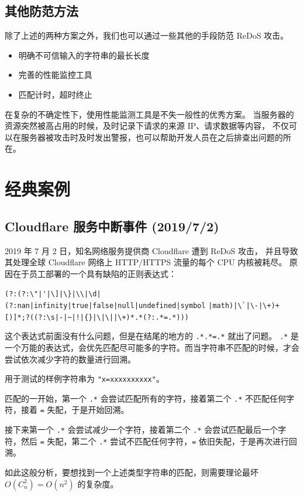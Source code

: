 \documentclass[hyperref,UTF8,12pt,a4paper]{ctexart}
\begin{document}
\subsection{其他防范方法}

除了上述的两种方案之外，我们也可以通过一些其他的手段防范 ReDoS 攻击。

\begin{itemize}
	\item 明确不可信输入的字符串的最长长度
	\item 完善的性能监控工具
	\item 匹配计时，超时终止
\end{itemize}

在复杂的不确定性下，使用性能监测工具是不失一般性的优秀方案。
当服务器的资源突然被高占用的时候，及时记录下请求的来源 IP、请求数据等内容，
不仅可以在服务器被攻击时及时发出警报，也可以帮助开发人员在之后排查出问题的所在。

\section{经典案例}

\subsection{Cloudflare 服务中断事件 (2019/7/2)}

2019 年 7 月 2 日，知名网络服务提供商 Cloudflare 遭到 ReDoS 攻击，
并且导致其处理全球 Cloudflare 网络上 HTTP/HTTPS 流量的每个 CPU 内核被耗尽。
原因在于员工部署的一个具有缺陷的正则表达式：

\verb^(?:(?:\"|'|\]|\}|\\|\d|(?:nan|infinity|true|false|null|undefined|symbol^
\verb^|math)|\`|\-|\+)+[)]*;?((?:\s|-|~|!|{}|\|\||\+)*.*(?:.*=.*)))^

这个表达式前面没有什么问题，但是在结尾的地方的 \verb|.*.*=.*| 就出了问题。
\verb|.*| 是一个万能的表达式，会优先匹配尽可能多的字符。而当字符串不匹配的时候，才会尝试依次减少字符的数量进行回溯。

用于测试的样例字符串为 \verb|"x=xxxxxxxxxx"|。

匹配的一开始，第一个 \verb|.*| 会尝试匹配所有的字符，接着第二个 \verb|.*| 不匹配任何字符，接着 \verb|=| 失配，于是开始回溯。

接下来第一个 \verb|.*| 会尝试减少一个字符，接着第二个 \verb|.*| 会尝试匹配最后一个字符，然后 \verb|=| 失配，第二个 \verb|.*| 尝试不匹配任何字符，\verb|=| 依旧失配，于是再次进行回溯。

如此这般分析，要想找到一个上述类型字符串的匹配，则需要理论最坏 $O(C^2_n) = O(n^2)$ 的复杂度。
\end{document}

